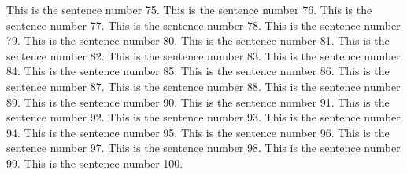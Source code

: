 \documentclass{article}
\begin{document}
This is the sentence number 75.
This is the sentence number 76.
This is the sentence number 77.
This is the sentence number 78.
This is the sentence number 79.
This is the sentence number 80.
This is the sentence number 81.
This is the sentence number 82.
This is the sentence number 83.
This is the sentence number 84.
This is the sentence number 85.
This is the sentence number 86.
This is the sentence number 87.
This is the sentence number 88.
This is the sentence number 89.
This is the sentence number 90.
This is the sentence number 91.
This is the sentence number 92.
This is the sentence number 93.
This is the sentence number 94.
This is the sentence number 95.
This is the sentence number 96.
This is the sentence number 97.
This is the sentence number 98.
This is the sentence number 99.
This is the sentence number 100.
\end{document}
